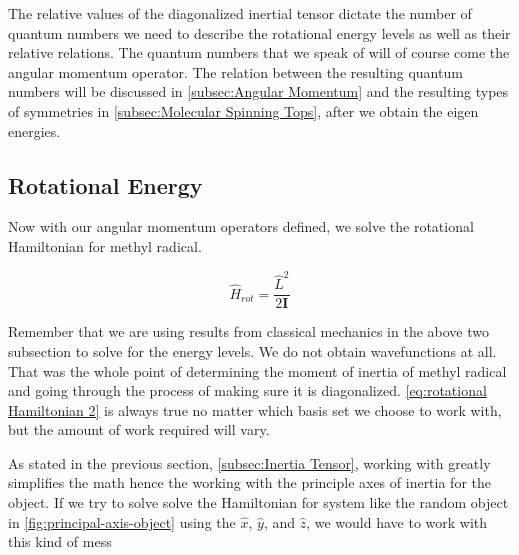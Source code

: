 \documentclass[11pt,a4paper]{book}
\begin{document}
			\noindent
			The relative values of the diagonalized inertial tensor dictate the number of quantum numbers we need to describe the rotational energy levels as well as their relative relations. The quantum numbers that we speak of will of course come the angular momentum operator. The relation between the resulting quantum numbers will be discussed in \autoref{subsec:Angular Momentum} and the resulting types of symmetries in \autoref{subsec:Molecular Spinning Tops}, after we obtain the eigen energies.
		
			
		\subsection{Rotational Energy}
			\label{subsec:Vibrational Quantum Number}
			Now with our angular momentum operators defined, we solve the rotational Hamiltonian for methyl radical.
			
			\begin{equation}
				\label{eq:rotational Hamiltonian 2}
				\hat{H}_{rot} = \dfrac{\hat{L}^2}{2\textbf{I}} 
			\end{equation}
		
			\noindent	
			Remember that we are using results from classical mechanics in the above two subsection to solve for the energy levels. We do not obtain wavefunctions at all. That was the whole point of determining the moment of inertia of methyl radical and going through the process of making sure it is diagonalized. \autoref{eq:rotational Hamiltonian 2} is always true no matter which basis set we choose to work with, but the amount of work required will vary. 
			
			As stated in the previous section, \autoref{subsec:Inertia Tensor}, working with greatly simplifies the math hence the working with the principle axes of inertia for the object. If we try to solve solve the Hamiltonian for system like the random object in \autoref{fig:principal-axis-object} using the $\hat{x}$, $\hat{y}$, and $\hat{z}$, we would have to work  with this kind of mess
			
\end{document}
